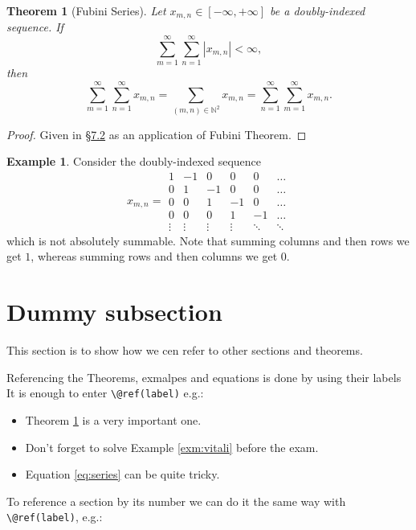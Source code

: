 \documentclass[
]{book}
\providecommand{\tightlist}{%
  \setlength{\itemsep}{0pt}\setlength{\parskip}{0pt}}
\newcommand{\N}{\mathbb{N}}
\newtheorem{theorem}{Theorem}[chapter]
\theoremstyle{definition}
\theoremstyle{definition}
\newtheorem{example}{Example}[chapter]
\theoremstyle{definition}
\theoremstyle{definition}
\theoremstyle{remark}
\begin{document}
\begin{theorem}[Fubini Series]
\protect\hypertarget{thm:seriesfubini}{}\label{thm:seriesfubini}Let
\(x_{m,n} \in [-\infty,+\infty]\) be a doubly-indexed sequence. If
\[\sum_{m=1}^\infty
\sum_{n=1}^\infty
|x_{m,n}|
<\infty
,\] then \[\sum_{m=1}^\infty
\sum_{n=1}^\infty
x_{m,n}
=
\sum_{(m,n)\in\N^2} x_{m,n}
=
\sum_{n=1}^\infty
\sum_{m=1}^\infty
x_{m,n}
.\]
\end{theorem}

\begin{proof}
Given in §\protect\hyperlink{sub:fubini}{7.2} as an application of Fubini Theorem.
\end{proof}

\begin{example}
Consider the doubly-indexed sequence \[x_{m,n}=
\begin{array}{|rrrrrr}
\hline
1 & -1 & 0 & 0 & 0 & \dots
\\
0 & 1 & -1 & 0 & 0 & \dots
\\
0 & 0 & 1 & -1 & 0 & \dots
\\
0 & 0 & 0 & 1 & -1 & \dots
\\
\vdots &
\vdots &
\vdots &
\vdots &
\ddots &
\ddots
\end{array}\] which is not absolutely summable. Note that summing
columns and then rows we get \(1\), whereas summing rows and then columns
we get \(0\).
\end{example}

\hypertarget{sub:dummy}{%
\section{Dummy subsection}\label{sub:dummy}}

This section is to show how we cen refer to other sections and theorems.

Referencing the Theorems, exmalpes and equations is done by using their labels
It is enough to enter \texttt{\textbackslash{}@ref(label)} e.g.:

\begin{itemize}
\tightlist
\item
  Theorem \ref{thm:seriesfubini} is a very important one.
\item
  Don't forget to solve Example \ref{exm:vitali} before the exam.
\item
  Equation \eqref{eq:series} can be quite tricky.
\end{itemize}

To reference a section by its number we can do it the same way with \texttt{\textbackslash{}@ref(label)}, e.g.:
\end{document}
